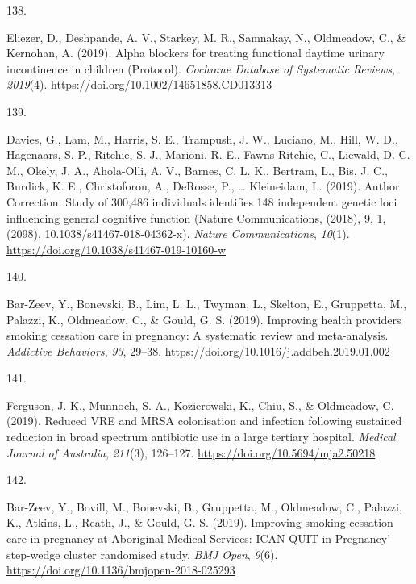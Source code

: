 \documentclass[11pt, a4paper]{awesome-cv}
\newlength{\csllabelwidth}
\newcommand{\CSLLeftMargin}[1]{\parbox[t]{\csllabelwidth}{#1}}
\newcommand{\CSLRightInline}[1]{\parbox[t]{\linewidth - \csllabelwidth}{#1}}
\begin{document}
\leavevmode\hypertarget{ref-eliezer_alpha_2019}{}%
\CSLLeftMargin{138. }
\CSLRightInline{Eliezer, D., Deshpande, A. V., Starkey, M. R., Samnakay,
N., Oldmeadow, C., \& Kernohan, A. (2019). Alpha blockers for treating
functional daytime urinary incontinence in children (Protocol).
\emph{Cochrane Database of Systematic Reviews}, \emph{2019}(4).
\url{https://doi.org/10.1002/14651858.CD013313}}

\leavevmode\hypertarget{ref-davies_author_2019}{}%
\CSLLeftMargin{139. }
\CSLRightInline{Davies, G., Lam, M., Harris, S. E., Trampush, J. W.,
Luciano, M., Hill, W. D., Hagenaars, S. P., Ritchie, S. J., Marioni, R.
E., Fawns-Ritchie, C., Liewald, D. C. M., Okely, J. A., Ahola-Olli, A.
V., Barnes, C. L. K., Bertram, L., Bis, J. C., Burdick, K. E.,
Christoforou, A., DeRosse, P., \ldots{} Kleineidam, L. (2019). Author
Correction: Study of 300,486 individuals identifies 148 independent
genetic loci influencing general cognitive function (Nature
Communications, (2018), 9, 1, (2098), 10.1038/s41467-018-04362-x).
\emph{Nature Communications}, \emph{10}(1).
\url{https://doi.org/10.1038/s41467-019-10160-w}}

\leavevmode\hypertarget{ref-bar-zeev_improving_2019}{}%
\CSLLeftMargin{140. }
\CSLRightInline{Bar-Zeev, Y., Bonevski, B., Lim, L. L., Twyman, L.,
Skelton, E., Gruppetta, M., Palazzi, K., Oldmeadow, C., \& Gould, G. S.
(2019). Improving health providers smoking cessation care in pregnancy:
A systematic review and meta-analysis. \emph{Addictive Behaviors},
\emph{93}, 29--38. \url{https://doi.org/10.1016/j.addbeh.2019.01.002}}

\leavevmode\hypertarget{ref-ferguson_reduced_2019}{}%
\CSLLeftMargin{141. }
\CSLRightInline{Ferguson, J. K., Munnoch, S. A., Kozierowski, K., Chiu,
S., \& Oldmeadow, C. (2019). Reduced VRE and MRSA colonisation and
infection following sustained reduction in broad spectrum antibiotic use
in a large tertiary hospital. \emph{Medical Journal of Australia},
\emph{211}(3), 126--127. \url{https://doi.org/10.5694/mja2.50218}}

\leavevmode\hypertarget{ref-bar-zeev_improving_2019-1}{}%
\CSLLeftMargin{142. }
\CSLRightInline{Bar-Zeev, Y., Bovill, M., Bonevski, B., Gruppetta, M.,
Oldmeadow, C., Palazzi, K., Atkins, L., Reath, J., \& Gould, G. S.
(2019). Improving smoking cessation care in pregnancy at Aboriginal
Medical Services: ICAN QUIT in Pregnancy' step-wedge cluster randomised
study. \emph{BMJ Open}, \emph{9}(6).
\url{https://doi.org/10.1136/bmjopen-2018-025293}}
\end{document}
